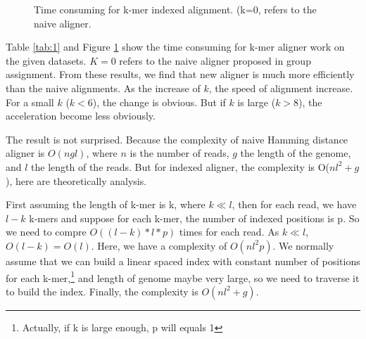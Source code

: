 \documentclass[a4paper]{article}
\begin{document}
\begin{figure}[!htb]
	\centering
	\caption{\label{fig:1}Time consuming for k-mer indexed alignment. (k=0, refers to  the naive aligner.}
\end{figure}

Table \ref{tab:1} and Figure \ref{fig:1} show the time consuming for k-mer aligner work on the given datasets. $K=0$ refers to the naive aligner proposed in group assignment. From these results, we find that new aligner is much more efficiently than the naive alignments. As the increase of $k$, the speed of alignment increase. For a small $k$ ($k<6$), the change is obvious. But if $k$ is large ($k>8$), the acceleration become less obviously.

The result is not surprised. Because the  complexity of naive Hamming distance aligner is $O(ngl)$, where $n$ is the number of reads, $g$ the length of the genome, and $l$ the length of the reads. But for indexed aligner, the complexity is O($nl^2+g$), here are theoretically analysis.

First assuming the length of k-mer is k, where $ k\ll l$, then for each read, we have $l-k$ k-mers and suppose for each k-mer, the number of indexed positions is p. So we need to compre $O((l-k)*l*p)$ times for each read. As $k\ll l$, $O(l-k)=O(l)$. Here, we have a complexity of $O(nl^{2}p)$. We normally assume that we can build a linear spaced index with constant number of positions for each k-mer,\footnote{Actually, if k is large enough, p will equals 1} and length of genome maybe very large, so we need to traverse it to build the index. Finally, the complexity is $O(nl^{2} + g)$.
\end{document}
